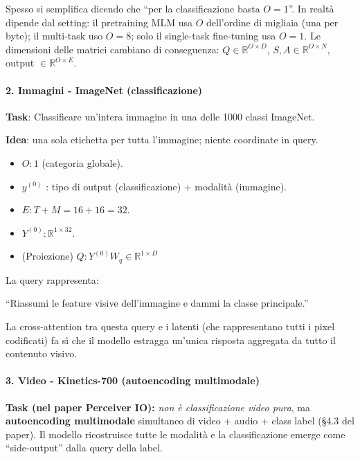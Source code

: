 \documentclass[
  11pt,
]{article}
\begin{document}
\begin{notabox}[title={\textbf{``1 query = 1 output'' --- non sempre!}}]
Spesso si semplifica dicendo che ``per la classificazione basta $O=1$''. In realtà dipende dal setting: il pretraining MLM usa $O$ dell'ordine di migliaia (una per byte); il multi-task uso $O = 8$; solo il single-task fine-tuning usa $O = 1$. Le dimensioni delle matrici cambiano di conseguenza: $Q \in \mathbb{R}^{O \times D}$, $S, A \in \mathbb{R}^{O \times N}$, output $\in \mathbb{R}^{O \times E}$.
\end{notabox}

\paragraph{2. \textbf{Immagini - ImageNet (classificazione)}}

\textbf{Task}: Classificare un'intera immagine in una delle 1000 classi
ImageNet.

\textbf{Idea}: una sola etichetta per tutta l'immagine;
niente coordinate in query.

\begin{itemize}
\item
  \(O:1\) (categoria globale).
\item
  \(y^{(0)}\) : tipo di output (classificazione) + modalità (immagine).
\item
  \(E:T + M = 16 + 16 = 32\).
\item
  \(Y^{(0)}:\mathbb{R}^{1 \times 32}\).
\item
  (Proiezione) \(Q:Y^{(0)}W_{q}{\in \mathbb{R}}^{1 \times D}\)
\end{itemize}


La query rappresenta:

``Riassumi le feature visive dell'immagine e dammi la classe
principale.''

La cross-attention tra questa query e i latenti (che rappresentano tutti
i pixel codificati) fa sì che il modello estragga un'unica risposta
aggregata da tutto il contenuto visivo.


\paragraph{3. \textbf{Video - Kinetics-700 (autoencoding multimodale)}}

\textbf{Task (nel paper Perceiver IO):} \emph{non è classificazione video pura}, ma \textbf{autoencoding multimodale} simultaneo di video + audio + class label (\S4.3 del paper). Il modello ricostruisce tutte le modalità e la classificazione emerge come ``side-output'' dalla query della label.
\end{document}
